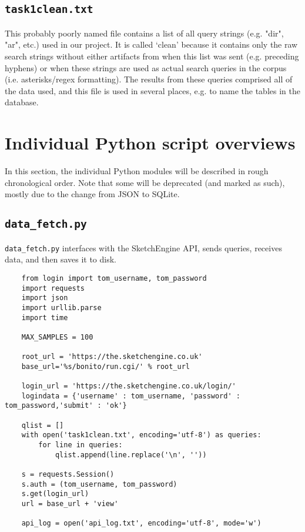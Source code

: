 \documentclass{article}      %
\begin{document}
	\subsection{\texttt{task1clean.txt}}
	
	This probably poorly named file contains a list of all query strings (e.g. "dir", "ar", etc.) used in our project. It is called `clean' because it contains only the raw search strings without either artifacts from when this list was sent (e.g. preceding hyphens) or when these strings are used as actual search queries in the corpus (i.e. asterisks/regex formatting). The results from these queries comprised all of the data used, and this file is used in several places, e.g. to name the tables in the database.
	
	
	\section{Individual Python script overviews}
	
	In this section, the individual Python modules will be described in rough chronological order. Note that some will be deprecated (and marked as such), mostly due to the change from JSON to SQLite.
	
	
	\subsection{\texttt{data\_fetch.py}}
	
	\texttt{data\_fetch.py} interfaces with the SketchEngine API, sends queries, receives data, and then saves it to disk.
	
	\begin{verbatim}
	from login import tom_username, tom_password
	import requests
	import json
	import urllib.parse
	import time
	
	MAX_SAMPLES = 100
	
	root_url = 'https://the.sketchengine.co.uk'
	base_url='%s/bonito/run.cgi/' % root_url
	
	login_url = 'https://the.sketchengine.co.uk/login/'
	logindata = {'username' : tom_username, 'password' : tom_password,'submit' : 'ok'}
	
	qlist = []
	with open('task1clean.txt', encoding='utf-8') as queries:
		for line in queries:
			qlist.append(line.replace('\n', ''))
	
	s = requests.Session()
	s.auth = (tom_username, tom_password)
	s.get(login_url)
	url = base_url + 'view'
	
	api_log = open('api_log.txt', encoding='utf-8', mode='w')
	\end{verbatim}
	
\end{document}
